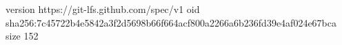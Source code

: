 version https://git-lfs.github.com/spec/v1
oid sha256:7c45722b4e5842a3f2d5698b66f664acf800a2266a6b236fd39e4af024e67bca
size 152
